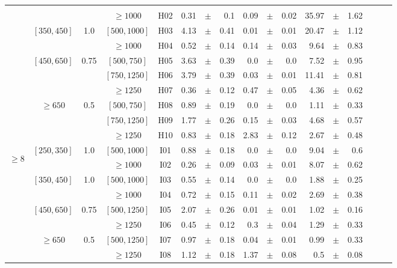 \begin{table}[ht]
\begin{center}
{\begin{tabular}{c|c|c|c|c|rrr|rrr|rrr|rrr|}
 &  \\
&
&&$\geq1000$
 & H02
 & 0.31&$\pm$&0.1 & 0.09&$\pm$&0.02 & 35.97&$\pm$&1.62
 &  \\
\cline{2-14}
&\multirow{2}{*}{$[350,450]$}&\multirow{2}{*}{1.0}
&$[500,1000]$
 & H03
 & 4.13&$\pm$&0.41 & 0.01&$\pm$&0.01 & 20.47&$\pm$&1.12
 &  \\
&
&&$\geq1000$
 & H04
 & 0.52&$\pm$&0.14 & 0.14&$\pm$&0.03 & 9.64&$\pm$&0.83
 &  \\
\cline{2-14}
&\multirow{3}{*}{$[450,650]$}&\multirow{2}{*}{0.75}
&$[500,750]$
 & H05
 & 3.63&$\pm$&0.39 & 0.0&$\pm$&0.0 & 7.52&$\pm$&0.95
 &  \\
&
&&$[750,1250]$
 & H06
 & 3.79&$\pm$&0.39 & 0.03&$\pm$&0.01 & 11.41&$\pm$&0.81
 &  \\
&
&&$\geq1250$
 & H07
 & 0.36&$\pm$&0.12 & 0.47&$\pm$&0.05 & 4.36&$\pm$&0.62
 &  \\
\cline{2-14}
&\multirow{3}{*}{$\geq650$}&\multirow{2}{*}{0.5}
&$[500,750]$
 & H08
 & 0.89&$\pm$&0.19 & 0.0&$\pm$&0.0 & 1.11&$\pm$&0.33
 &  \\
&
&&$[750,1250]$
 & H09
 & 1.77&$\pm$&0.26 & 0.15&$\pm$&0.03 & 4.68&$\pm$&0.57
 &  \\
&
&&$\geq1250$
 & H10
 & 0.83&$\pm$&0.18 & 2.83&$\pm$&0.12 & 2.67&$\pm$&0.48
 &  \\
\cline{2-14}
\hline
\hline
\multirow{8}{*}{\begin{sideways}$\geq8$\end{sideways}}
&\multirow{2}{*}{$[250,350]$}&\multirow{2}{*}{1.0}
&$[500,1000]$
 & I01
 & 0.88&$\pm$&0.18 & 0.0&$\pm$&0.0 & 9.04&$\pm$&0.6
 &  \\
&
&&$\geq1000$
 & I02
 & 0.26&$\pm$&0.09 & 0.03&$\pm$&0.01 & 8.07&$\pm$&0.62
 &  \\
\cline{2-14}
&\multirow{2}{*}{$[350,450]$}&\multirow{2}{*}{1.0}
&$[500,1000]$
 & I03
 & 0.55&$\pm$&0.14 & 0.0&$\pm$&0.0 & 1.88&$\pm$&0.25
 &  \\
&
&&$\geq1000$
 & I04
 & 0.72&$\pm$&0.15 & 0.11&$\pm$&0.02 & 2.69&$\pm$&0.38
 &  \\
\cline{2-14}
&\multirow{2}{*}{$[450,650]$}&\multirow{2}{*}{0.75}
&$[500,1250]$
 & I05
 & 2.07&$\pm$&0.26 & 0.01&$\pm$&0.01 & 1.02&$\pm$&0.16
 &  \\
&
&&$\geq1250$
 & I06
 & 0.45&$\pm$&0.12 & 0.3&$\pm$&0.04 & 1.29&$\pm$&0.33
 &  \\
\cline{2-14}
&\multirow{2}{*}{$\geq650$}&\multirow{2}{*}{0.5}
&$[500,1250]$
 & I07
 & 0.97&$\pm$&0.18 & 0.04&$\pm$&0.01 & 0.99&$\pm$&0.33
 &  \\
&
&&$\geq1250$
 & I08
 & 1.12&$\pm$&0.18 & 1.37&$\pm$&0.08 & 0.5&$\pm$&0.08
 &  \\
\cline{2-14}
\hline\end{tabular}}\end{center}\end{table}